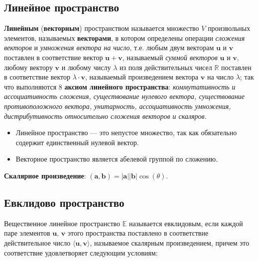 \subsection{Линейное пространство}

\textbf{Линейным} (\textbf{векторным}) пространством называется множество $V$ произвольных элементов, называемых \textbf{векторами}, в котором определены операции \textit{сложения векторов} и \textit{умножения вектора на число}, т.е. любым двум векторам $\mathbf{u}$ и ${\mathbf{v}}$ поставлен в соответствие вектор $\mathbf{u}+\mathbf{v}$, называемый \textit{суммой векторов} $\mathbf{u}$ и ${\mathbf{v}}$, любому вектору ${\mathbf{v}}$ и любому числу $\lambda$ из поля действительных чисел $\mathbb{R}$ поставлен в соответствие вектор $\lambda\cdot\mathbf{v}$, называемый произведением вектора $\mathbf{v}$ на число $\lambda$; так что выполняются 8 \textbf{аксиом линейного пространства}:\textit{ коммутативность и ассоциативность сложения, существование нулевого вектора, существование противоположного вектора, унитарность, ассоциативность умножения, дистрибутивность относительно сложения векторов и скаляров}.

\begin{itemize}
    \setlength\itemsep{-0.2em}
    \item Линейное пространство — это непустое множество, так как обязательно содержит единственный нулевой вектор.
    \item Векторное пространство является абелевой группой по сложению.
\end{itemize}

\textbf{Скалярное произведение}: $(\mathbf {a} ,\mathbf {b} )=|\mathbf {a} ||\mathbf {b} |\cos(\theta).$


\subsection{Евклидово пространство}

Вещественное линейное пространство $\mathbb{E}$ называется евклидовым, если каждой паре элементов $\mathbf{u},\,\mathbf{v}$ этого пространства поставлено в соответствие действительное число $\langle\mathbf{u},\mathbf{v} \rangle$, называемое скалярным произведением, причем это соответствие удовлетворяет следующим условиям:

